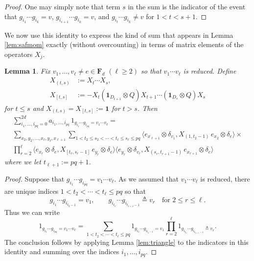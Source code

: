 \documentclass[10pt,reqno]{amsart}
\newtheorem{lem}[thm]{Lemma}
\theoremstyle{definition}
\theoremstyle{remark}
\numberwithin{equation}{section}
\numberwithin{figure}{section}
\numberwithin{table}{section}
\newcommand{\id}{\mathbf{1}}
\begin{document}
\begin{proof}
One may simply note that term $s$ in the sum is the indicator
of the event that $g_{i_1}\cdots g_{i_k}=v$, 
$g_{i_{s+1}}\cdots g_{i_k}=v$, and
$g_{i_t}\cdots g_{i_k}\ne v$ for $1<t<s+1$.
\end{proof}

We now use this identity to express the kind of sum that appears in Lemma 
\ref{lem:safmom} exactly (without overcounting) in terms 
of matrix elements of the operators $X_j$.

\begin{lem}
\label{lem:noovercount}
Fix $v_1,\ldots,v_\ell\ne e\in\mathbf{F}_d$ $(\ell\ge 2)$ so that
$v_1\cdots v_\ell$ is reduced. Define
\begin{align*}
	X_{(t,s)} &:= X_t\cdots X_s, \\
	X_{[t,s]} &:= -X_t(\id_{D_{t+1}}\otimes Q)X_{t+1}\cdots
	(\id_{D_s}\otimes Q)X_s
\end{align*}
for $t\le s$ and $X_{(t,s)}=X_{[t,s]}:=\id$ for $t>s$. Then
\begin{multline*}
        \sum_{i_1,\ldots,i_{pq}=0}^{2d}
	a_{i_1,\ldots,i_{pq}}\,
        1_{g_{i_1}\cdots g_{i_{pq}}=v_1\cdots v_\ell}= \\
%
	\sum_{x_2,y_2,\ldots,x_\ell,y_\ell,x_{\ell+1}}
	\sum_{1<t_2\le s_2<\cdots<t_\ell\le s_\ell\le pq}
	\langle e_{x_{\ell+1}}\otimes\delta_{v_1},X_{(1,t_2-1)}
	\,e_{x_2}\otimes\delta_e\rangle 
\times\mbox{}
\\
	\prod_{r=2}^{\ell}
	\langle e_{x_r}\otimes
	\delta_e,X_{[t_r,s_r-1]}\,e_{y_r}\otimes\delta_e\rangle
	\langle e_{y_r}\otimes\delta_{v_r},X_{(s_r,t_{r+1}-1)}
	\,e_{x_{r+1}}\otimes\delta_e\rangle
\end{multline*}
where we let $t_{\ell+1}:=pq+1$.
\end{lem}

\begin{proof}
Suppose that $g_{i_1}\cdots g_{i_{pq}}=v_1\cdots v_\ell$. As we assumed 
that
$v_1\cdots v_\ell$ is reduced, there are unique indices
$1<t_2<\cdots<t_\ell\le pq$ so that
$$
	g_{i_1}\cdots g_{i_{t_2-1}}=v_1,\qquad
	g_{i_{t_r}}\cdots g_{i_{t_{r+1}-1}}\triangleq v_r
	\quad\text{for }2\le r\le \ell.
$$
Thus we can write
$$
        1_{g_{i_1}\cdots g_{i_{pq}}=v_1\cdots v_\ell} =
        \sum_{1<t_2<\cdots<t_\ell\le pq}
        1_{g_{i_1}\cdots g_{i_{t_2-1}}=v_1}
        \prod_{r=2}^\ell
        1_{g_{i_{t_r}}\cdots g_{i_{t_{r+1}-1}}\triangleq v_r}.
$$
The conclusion follows by applying Lemma \ref{lem:triangle}
to the indicators in this identity and summing over the indices 
$i_1,\ldots,i_{pq}$.
\end{proof}
\end{document}
